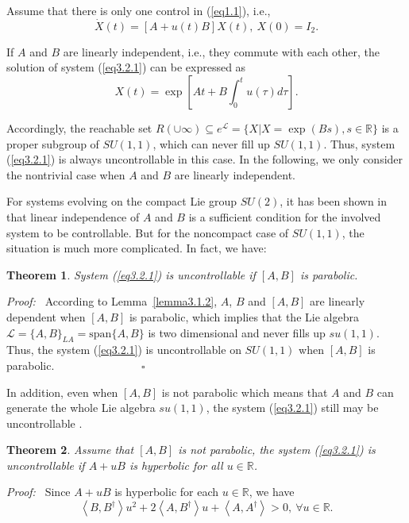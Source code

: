 \documentclass[onecolumn,showpacs,showkeys,preprintnumbers]{revtex4}
\newtheorem{theorem}{Theorem}[section]
\begin{document}
Assume that there is only one control in (\ref{eq1.1}), i.e.,\noindent\begin{equation}\label{eq3.2.1}
\dot{X}(t)=[A+u(t)B]X(t),~X(0)=I_2.
\end{equation}

\noindent If $A$ and $B$ are linearly independent, i.e., they
commute with each other, the solution of system (\ref{eq3.2.1})
can be expressed as\noindent\begin{equation}\label{eq3.2.2}
X(t)=\exp\left[At+B\int_0^tu(\tau)d\tau\right].
\end{equation}

\noindent Accordingly, the reachable set
$R(\cup{\infty}){\subseteq}e^\mathcal{L}=\{X|X=\exp(Bs),s\in\mathbb{R}\}$
is a proper subgroup of $SU(1,1)$, which can never fill up
$SU(1,1)$. Thus, system (\ref{eq3.2.1}) is always uncontrollable
in this case. In the following, we only consider the nontrivial
case when $A$ and $B$ are linearly independent.

For systems evolving on the compact Lie group $SU(2)$, it has been
shown in \cite{Alessandro1, Ramakrishna2} that linear independence
of $A$ and $B$ is a sufficient condition for the involved system
to be controllable. But for the noncompact case of $SU(1,1)$, the
situation is much more complicated. In fact, we have:

\noindent\begin{theorem}\label{theorem3.2.1}System (\ref{eq3.2.1}) is uncontrollable if $[A,B]$ is parabolic.
\end{theorem}

{\it{Proof:~}} According to Lemma~\ref{lemma3.1.2}, $A$, $B$ and
$[A,B]$ are linearly dependent when $[A,B]$ is parabolic, which
implies that the Lie algebra
$\mathcal{L}=\{A,B\}_{LA}=\text{span}\{A,B\}$ is two dimensional
and never fills up $su(1,1)$. Thus, the system (\ref{eq3.2.1}) is
uncontrollable on $SU(1,1)$ when $[A,B]$ is parabolic.
~~~~~~~~~~~~~~~$\square$

In addition, even when $[A,B]$ is not parabolic which means that
$A$ and $B$ can generate the whole Lie algebra $su(1,1)$, the
system (\ref{eq3.2.1}) still may be uncontrollable
.\noindent\begin{theorem}\label{theorem3.2.2}Assume that $[A,B]$ is not parabolic, the system (\ref{eq3.2.1})
is uncontrollable if $A+uB$ is hyperbolic for all
$u\in\mathbb{R}$.
\end{theorem}

{\it{Proof:~}} Since $A+uB$ is hyperbolic for each
$u\in\mathbb{R}$, we have\noindent\begin{equation}\label{eq3.2.3}\left<B,B^\dag\right>u^2+2\left<A,B^\dag\right>u+\left<A,A^\dag\right>>0,~{\forall}u\in\mathbb{R}.
\end{equation}
\end{document}

